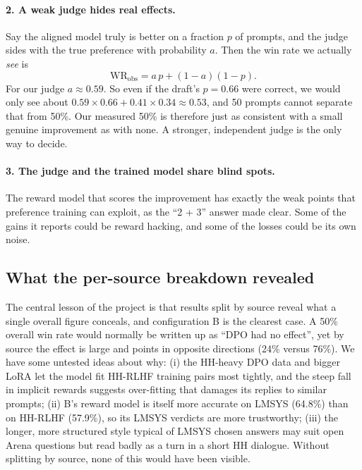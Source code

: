 \paragraph{2. A weak judge hides real effects.} Say the aligned model truly is better on a fraction $p$ of prompts, and the judge sides with the true preference with probability $a$. Then the win rate we actually \emph{see} is
\begin{equation}
  \mathrm{WR}_{\text{obs}} = a\,p + (1-a)(1-p).
\end{equation}
For our judge $a\approx0.59$. So even if the draft's $p=0.66$ were correct, we would only see about $0.59\times0.66 + 0.41\times0.34\approx0.53$, and 50 prompts cannot separate that from 50\%. Our measured 50\% is therefore just as consistent with a small genuine improvement as with none. A stronger, independent judge is the only way to decide.

\paragraph{3. The judge and the trained model share blind spots.} The reward model that scores the improvement has exactly the weak points that preference training can exploit, as the ``2 + 3'' answer made clear. Some of the gains it reports could be reward hacking, and some of the losses could be its own noise.

\subsection{What the per-source breakdown revealed}
The central lesson of the project is that results split by source reveal what a single overall figure conceals, and configuration B is the clearest case. A 50\% overall win rate would normally be written up as ``DPO had no effect'', yet by source the effect is large and points in opposite directions (24\% versus 76\%). We have some untested ideas about why: (i) the HH-heavy DPO data and bigger LoRA let the model fit HH-RLHF training pairs most tightly, and the steep fall in implicit rewards suggests over-fitting that damages its replies to similar prompts; (ii) B's reward model is itself more accurate on LMSYS (64.8\%) than on HH-RLHF (57.9\%), so its LMSYS verdicts are more trustworthy; (iii) the longer, more structured style typical of LMSYS chosen answers may suit open Arena questions but read badly as a turn in a short HH dialogue. Without splitting by source, none of this would have been visible.


